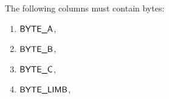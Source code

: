 The following columns must contain bytes:
\begin{multicols}{4}
\begin{enumerate}
	\item $\textsf{BYTE\_A}{}$,
	\item $\textsf{BYTE\_B}{}$,
	\item $\textsf{BYTE\_C}{}$,
	\item $\textsf{BYTE\_LIMB}{}$,
\end{enumerate}
\end{multicols}
